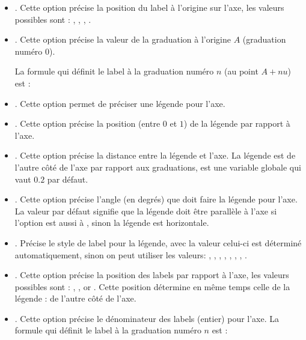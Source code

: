 \begin{itemize}
    \item {}. Cette option précise la position du label à l'origine sur l'axe, les valeurs possibles sont : , , , .
    
    \item {}. Cette option précise la valeur de la graduation à l'origine $A$ (graduation numéro $0$).
    
    La formule qui définit le label à la graduation numéro $n$ (au point $A+nu$) est : 

    \item {}. Cette option permet de préciser une légende pour l'axe.
    
    \item {}. Cette option précise la position (entre $0$ et $1$) de la légende par rapport à l'axe.
    
    \item {}. Cette option précise la distance entre la légende et l'axe. La légende est de l'autre côté de l'axe par rapport aux graduations,  est une variable globale qui vaut $0.2$ par défaut.
    
    \item {}. Cette option précise l'angle (en degrés) que doit faire la légende pour l'axe. La valeur  par défaut signifie que la légende doit être parallèle à l'axe si l'option  est aussi à , sinon la légende est horizontale.
    
    \item {}. Précise le style de label pour la légende, avec la valeur  celui-ci est déterminé automatiquement, sinon on peut utiliser les valeurs: , , , , , , , .
    
    \item {}. Cette option précise la position des labels par rapport à l'axe, les valeurs possibles sont : , , or . Cette position détermine en même temps celle de la légende : de l'autre côté de l'axe.
    
    \item {}. Cette option précise le dénominateur des labels (entier) pour l'axe. La formule qui définit le label à la graduation numéro $n$ est : 
    

\end{itemize}
